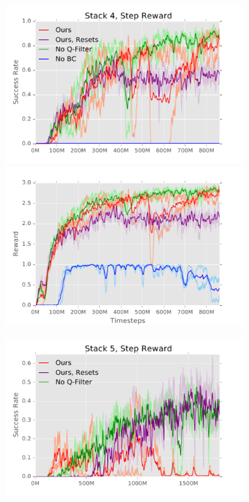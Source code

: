 \begin{figure}[t]%
    \vspace{6pt}
    \centering
    \begin{subfigure}{0.3\linewidth}
        \includegraphics[width=1.0\linewidth]{bcddpg/figs/4a_success}
        \includegraphics[width=1.0\linewidth]{bcddpg/figs/4a_reward}
    \end{subfigure}
    \begin{subfigure}{0.3\linewidth}
        \includegraphics[width=1.0\linewidth]{bcddpg/figs/5_success}

\end{subfigure}
\end{figure}
